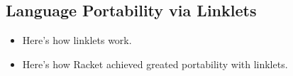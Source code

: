 \subsection{Language Portability via Linklets}
\label{subsec:linklets}

\begin{itemize}
\item Here's how linklets work.

\item Here's how Racket achieved greated portability with linklets.
\end{itemize}
